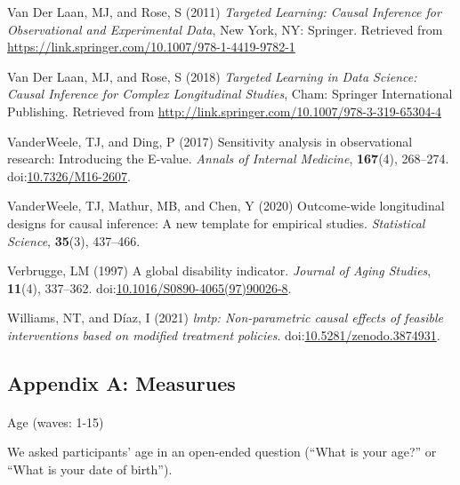 \documentclass[
  singlecolumn]{article}
\makeatletter
\let\oldparagraph\paragraph
\renewcommand{\paragraph}{
    \@ifstar
      \xxxParagraphStar
      \xxxParagraphNoStar
  }
\newcommand{\xxxParagraphStar}[1]{\oldparagraph*{#1}\mbox{}}
\newcommand{\xxxParagraphNoStar}[1]{\oldparagraph{#1}\mbox{}}
\newlength{\cslhangindent}
\newenvironment{CSLReferences}[2] %
 {\begin{list}{}{%
  \setlength{\itemindent}{0pt}
  \setlength{\leftmargin}{0pt}
  \setlength{\parsep}{0pt}
  \ifodd #1
   \setlength{\leftmargin}{\cslhangindent}
   \setlength{\itemindent}{-1\cslhangindent}
  \fi
  \setlength{\itemsep}{#2\baselineskip}}}
 {\end{list}}
\makeatother
\begin{document}
\begin{CSLReferences}{1}{0}
Van Der Laan, MJ, and Rose, S (2011) \emph{Targeted Learning: Causal
Inference for Observational and Experimental Data}, New York, NY:
Springer. Retrieved from
\url{https://link.springer.com/10.1007/978-1-4419-9782-1}

Van Der Laan, MJ, and Rose, S (2018) \emph{Targeted Learning in Data
Science: Causal Inference for Complex Longitudinal Studies}, Cham:
Springer International Publishing. Retrieved from
\url{http://link.springer.com/10.1007/978-3-319-65304-4}

VanderWeele, TJ, and Ding, P (2017) Sensitivity analysis in
observational research: Introducing the {E}-value. \emph{Annals of
Internal Medicine}, \textbf{167}(4), 268--274.
doi:\href{https://doi.org/10.7326/M16-2607}{10.7326/M16-2607}.

VanderWeele, TJ, Mathur, MB, and Chen, Y (2020) Outcome-wide
longitudinal designs for causal inference: A new template for empirical
studies. \emph{Statistical Science}, \textbf{35}(3), 437--466.

Verbrugge, LM (1997) A global disability indicator. \emph{Journal of
Aging Studies}, \textbf{11}(4), 337--362.
doi:\href{https://doi.org/10.1016/S0890-4065(97)90026-8}{10.1016/S0890-4065(97)90026-8}.

Williams, NT, and Díaz, I (2021) \emph{{l}mtp: Non-parametric causal
effects of feasible interventions based on modified treatment policies}.
doi:\href{https://doi.org/10.5281/zenodo.3874931}{10.5281/zenodo.3874931}.

\end{CSLReferences}

\newpage{}

\subsection{Appendix A: Measurues}\label{appendix-measures}

\paragraph{Age (waves: 1-15)}\label{age-waves-1-15}

We asked participants' age in an open-ended question (``What is your
age?'' or ``What is your date of birth'').
\end{document}
